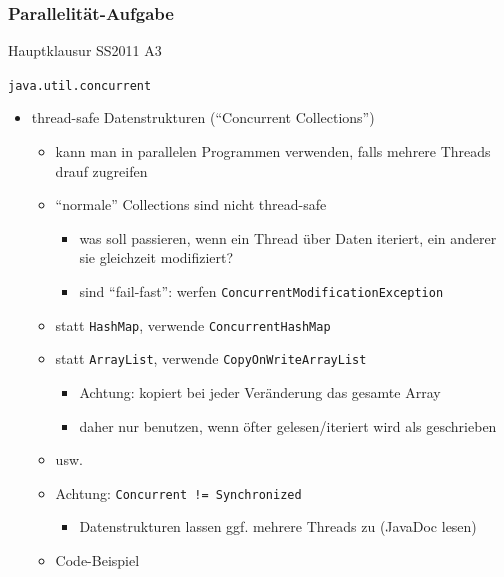 \documentclass[18pt]{beamer}
\begin{document}
	\begin{frame}
		\frametitle{Parallelität-Aufgabe}
		\begin{huge}
				\centering Hauptklausur SS2011 A3
		\end{huge}
	\end{frame}

	\begin{frame}{\texttt{java.util.concurrent}}
		\begin{itemize}
			\item thread-safe Datenstrukturen (\enquote{Concurrent Collections})
			\begin{itemize}
				\item kann man in parallelen Programmen verwenden, falls mehrere Threads drauf zugreifen
				\item \enquote{normale} Collections sind nicht thread-safe 
				\begin{itemize}
					\item was soll passieren, wenn ein Thread über Daten iteriert, ein anderer sie gleichzeit modifiziert?
					\item sind \enquote{fail-fast}: werfen \texttt{ConcurrentModificationException}
				\end{itemize} \pause
				\item statt \texttt{HashMap}, verwende \texttt{ConcurrentHashMap}
				\item statt \texttt{ArrayList}, verwende \texttt{CopyOnWriteArrayList}
				\begin{itemize}
					\item Achtung: kopiert bei jeder Veränderung das gesamte Array
					\item daher nur benutzen, wenn öfter gelesen/iteriert wird als geschrieben
				\end{itemize}
				\item usw. \pause
				\item Achtung: \texttt{Concurrent != Synchronized}
				\begin{itemize}
					\item Datenstrukturen lassen ggf. mehrere Threads zu (JavaDoc lesen)
				\end{itemize}
				\pause \item Code-Beispiel
			\end{itemize}
		\end{itemize}
	\end{frame}
\end{document}
